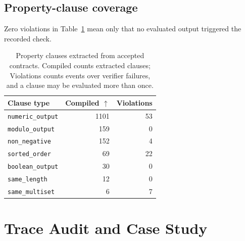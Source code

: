 \documentclass{article}
\newcommand{\up}{\ensuremath{\uparrow}}
\begin{document}
\subsection{Property-clause coverage}

Zero violations in Table~\ref{tab:properties} mean only that no evaluated output triggered the recorded check.

\begin{table}[H]
\centering
\small
\begin{tabular}{@{}lrr@{}}
\toprule
Clause type & Compiled \up & Violations \\
\midrule
\texttt{numeric\_output} & 1101 & 53 \\
\texttt{modulo\_output} & 159 & 0 \\
\texttt{non\_negative} & 152 & 4 \\
\texttt{sorted\_order} & 69 & 22 \\
\texttt{boolean\_output} & 30 & 0 \\
\texttt{same\_length} & 12 & 0 \\
\texttt{same\_multiset} & 6 & 7 \\
\bottomrule
\end{tabular}
\caption{Property clauses extracted from accepted contracts. Compiled counts extracted clauses; Violations counts events over verifier failures, and a clause may be evaluated more than once.}
\label{tab:properties}
\end{table}


\section{Trace Audit and Case Study}
\label{app:trace-audit}


\end{document}
